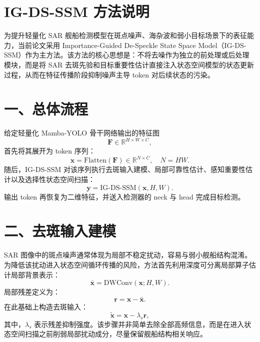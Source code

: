 \documentclass[UTF8,10pt]{ctexart}
\begin{document}
\section*{IG-DS-SSM 方法说明}

为提升轻量化 SAR 舰船检测模型在斑点噪声、海杂波和弱小目标场景下的表征能力，当前论文采用 Importance-Guided De-Speckle State Space Model（IG-DS-SSM）作为主方法。该方法的核心思想是：不将去噪作为独立的前处理或后处理模块，而是将 SAR 去斑先验和目标重要性估计直接注入状态空间模型的状态更新过程，从而在特征传播阶段抑制噪声主导 token 对后续状态的污染。

\section*{一、总体流程}

给定轻量化 Mamba-YOLO 骨干网络输出的特征图
\begin{equation}
  \mathbf{F}\in\mathbb{R}^{H\times W\times C},
\end{equation}
首先将其展开为 token 序列：
\begin{equation}
  \mathbf{x}=\mathrm{Flatten}(\mathbf{F})\in\mathbb{R}^{N\times C},\quad N=HW.
\end{equation}
随后，IG-DS-SSM 对该序列执行去斑输入建模、局部可靠性估计、感知重要性估计以及选择性状态空间扫描：
\begin{equation}
  \mathbf{y}=\mathrm{IG\mbox{-}DS\mbox{-}SSM}(\mathbf{x},H,W).
\end{equation}
输出 token 再恢复为二维特征，并送入检测器的 neck 与 head 完成目标检测。

\section*{二、去斑输入建模}

SAR 图像中的斑点噪声通常体现为局部不稳定扰动，容易与弱小舰船结构混淆。为降低该扰动进入状态空间循环传播的风险，方法首先利用深度可分离局部算子估计局部背景表示：
\begin{equation}
  \bar{\mathbf{x}}=\mathrm{DWConv}(\mathbf{x};H,W).
\end{equation}
局部残差定义为：
\begin{equation}
  \mathbf{r}=\mathbf{x}-\bar{\mathbf{x}}.
\end{equation}
在此基础上构造去斑输入：
\begin{equation}
  \widetilde{\mathbf{x}}=\mathbf{x}-\lambda_s\mathbf{r},
\end{equation}
其中，$\lambda_s$ 表示残差抑制强度。该步骤并非简单去除全部高频信息，而是在进入状态空间扫描之前削弱局部扰动成分，尽量保留舰船结构相关响应。
\end{document}

